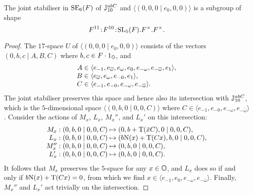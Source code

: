 \begin{lemma}
	\label{lemma1_stab_joint_3}
	The joint stabiliser in $\mathrm{SE}_6(F)$ of\phantom{;} $\mathbb{J}_{10}^{abC}$ and $\langle (0,0,0 \mid e_0,0,0) \rangle$ is a
	 subgroup
	of shape 
	\begin{equation}
		F^{11}\mathord{{\;\!{:}\;\!}} F^{10}\mathord{{\;\!{:}\;\!}}\mathrm{SL}_5(F).F^{\times}.F^{\times}. 
	\end{equation}
\end{lemma}

\begin{proof}
	The $17$-space $U$ of $\langle (0,0,0 \mid e_0,0,0) \rangle$ 
	consists of the vectors 
	$(0,b,c \mid A,B,C)$ where $b,c \in F\cdot 1_{\mathbb{O}}$, and
	\begin{equation*}
		\begin{array}{r@{\;}c@{\;}l}
			A & \in & \langle e_{-1}, e_{\bar{\omega}}, e_{\omega}, e_0, e_{-\omega}, e_{-\bar{\omega}}, e_1 \rangle, \\
			B & \in & \langle e_{\bar{\omega}}, e_{\omega}, e_{-0}, e_1 \rangle, \\
			C & \in & \langle e_{-1}, e_{-0}, e_{-\omega}, e_{-\bar{\omega}} \rangle.
		\end{array}
	\end{equation*}
	The joint stabiliser preserves this space and hence also its intersection with $\mathbb{J}_{10}^{abC}$, which is the 
	$5$-dimensional space
	$\langle (0,b,0 \mid 0,0,C) \rangle$ where $C \in  \langle e_{-1}, e_{-0}, e_{-\omega}, e_{-\bar{\omega}} \rangle$. Consider the actions of
	$M_x$, $L_x$, $M_x''$, and $L_x'$ on this intersection:
	\begin{equation*}
		\begin{array}{r@{\;}c@{\;}l}
			M_x : (0,b,0\mid 0,0,C) & \mapsto & (0,b+\Tr(\ovx C),0\mid 0,0,C), \\
			L_x : (0,b,0\mid 0,0,C) & \mapsto & (b\NN(x) + \Tr(C x),b,0\mid 0,0,C), \\
			M_x'' : (0,b,0\mid 0,0,C) & \mapsto & (0,b,0\mid 0,0,C), \\
			L_x' : (0,b,0\mid 0,0,C) & \mapsto & (0,b,0\mid 0,0,C).
		\end{array}
	\end{equation*}	 
	It follows that $M_x$ preserves the $5$-space for any $x \in \mathbb{O}$, and $L_x$ does so if and only if $b\mathord{\mathrm{N}}(x) + \operatorname{T}(Cx) = 0$, from 
	which we find $x \in \langle e_{-1}, e_{0}, e_{-\omega}, e_{-\bar{\omega}} \rangle$. Finally, $M_x''$ and $L_x'$ act trivially on the intersection.
	


\end{proof}
